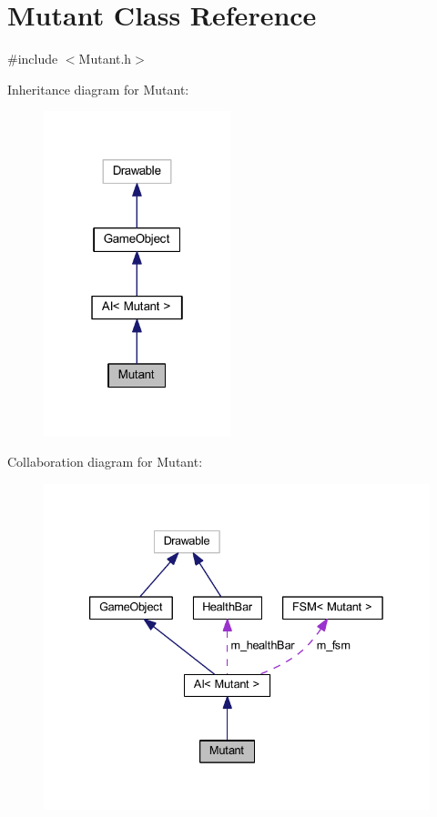 \hypertarget{class_mutant}{}\section{Mutant Class Reference}
\label{class_mutant}


{\ttfamily \#include $<$Mutant.\+h$>$}



Inheritance diagram for Mutant\+:
\nopagebreak
\begin{figure}[H]
\begin{center}
\leavevmode
\includegraphics[width=154pt]{class_mutant__inherit__graph}
\end{center}
\end{figure}


Collaboration diagram for Mutant\+:
\nopagebreak
\begin{figure}[H]
\begin{center}
\leavevmode
\includegraphics[width=333pt]{class_mutant__coll__graph}
\end{center}
\end{figure}
